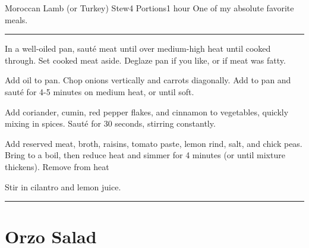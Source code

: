 \documentclass[openany]{book}
\begin{document}
\begin{recipe}[MoroccanStew]{Moroccan Lamb (or Turkey) Stew}{4 Portions}{1 hour}
\freeform One of my absolute favorite meals.
\freeform\rule{\textwidth}{0.05pt}

In a well-oiled pan, saut\'{e} meat until over medium-high heat until cooked through. Set cooked meat aside. Deglaze pan if you like, or if meat was fatty.


Add oil to pan. Chop onions vertically and carrots diagonally. Add to pan and saut\'{e} for 4-5 minutes on medium heat, or until soft.


Add coriander, cumin, red pepper flakes, and cinnamon to vegetables, quickly mixing in spices. Saut\'{e} for 30 seconds, stirring constantly.


Add reserved meat, broth, raisins, tomato paste, lemon rind, salt, and chick peas. Bring to a boil, then reduce heat and simmer for 4 minutes (or until mixture thickens). Remove from heat


Stir in cilantro and lemon juice.


\freeform\rule{\textwidth}{0.05pt}

\end{recipe}

\chapter{Orzo Salad}\label{orzo-salad}
\end{document}
